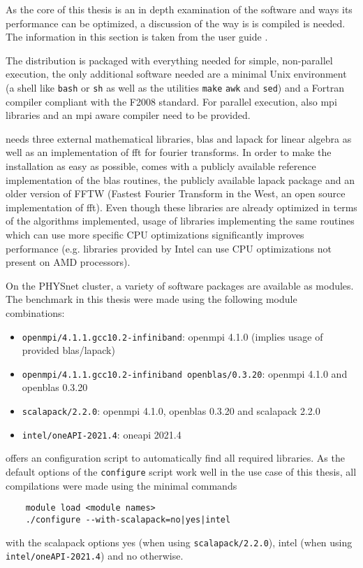 \documentclass[main.tex]{subfiles}
\begin{document}
As the core of this thesis is an in depth examination of the \QE software and ways its performance can be optimized, a discussion of the way is is compiled is needed.
The information in this section is taken from the  user guide \cite{noauthor_quantum_nodate}.

The \QE distribution is packaged with everything needed for simple, non-parallel execution, the only additional software needed are a minimal Unix environment (a shell like \texttt{bash} or \texttt{sh} as well as the utilities \texttt{make} \texttt{awk} and \texttt{sed}) and a Fortran compiler compliant with the F2008 standard.
For parallel execution, also \gls{mpi} libraries and an \gls{mpi} aware compiler need to be provided.

\QE needs three external mathematical libraries, \gls{blas} and \gls{lapack} for linear algebra as well as an implementation of \gls{fft} for fourier transforms.
In order to make the installation as easy as possible, \QE comes with a publicly available reference implementation of the \gls{blas} routines, the publicly available \gls{lapack} package and an older version of FFTW (Fastest Fourier Transform in the West, an open source implementation of \gls{fft}).
Even though these libraries are already optimized in terms of the algorithms implemented, usage of libraries implementing the same routines which can use more specific CPU optimizations significantly improves performance (e.g. libraries provided by Intel can use CPU optimizations not present on AMD processors).

On the PHYSnet cluster, a variety of software packages are available as modules.
The benchmark in this thesis were made using the following module combinations:
\begin{itemize}
    \item \texttt{openmpi/4.1.1.gcc10.2-infiniband}: \gls{openmpi} 4.1.0 (implies usage of \QE provided \gls{blas}/\gls{lapack})
    \item \texttt{openmpi/4.1.1.gcc10.2-infiniband openblas/0.3.20}: \gls{openmpi} 4.1.0 and \gls{openblas} 0.3.20
    \item \texttt{scalapack/2.2.0}: \gls{openmpi} 4.1.0, \gls{openblas} 0.3.20 and \gls{scalapack} 2.2.0
    \item \texttt{intel/oneAPI-2021.4}: \gls{oneapi} 2021.4
\end{itemize}

\QE offers an configuration script to automatically find all required libraries.
As the default options of the \texttt{configure} script work well in the use case of this thesis, all compilations were made using the minimal commands
\begin{verbatim}
    module load <module names>
    ./configure --with-scalapack=no|yes|intel
\end{verbatim}
with the scalapack options yes (when using \texttt{scalapack/2.2.0}), intel (when using \\ \texttt{intel/oneAPI-2021.4}) and no otherwise.
\end{document}
